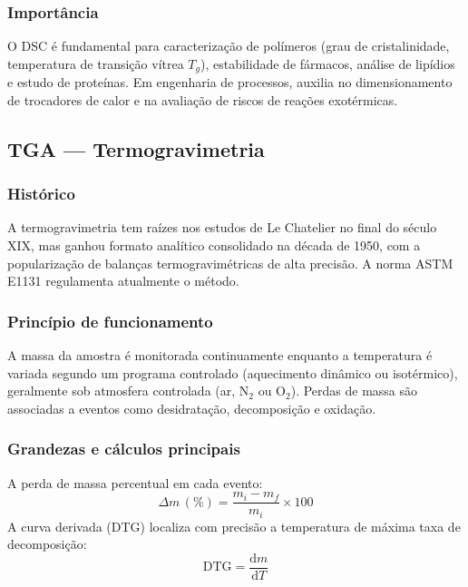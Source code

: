 \subsubsection*{Importância}

O DSC é fundamental para caracterização de polímeros (grau de
cristalinidade, temperatura de transição vítrea $T_g$), estabilidade de
fármacos, análise de lipídios e estudo de proteínas. Em engenharia de
processos, auxilia no dimensionamento de trocadores de calor e na avaliação
de riscos de reações exotérmicas.

\subsection{TGA --- Termogravimetria}

\subsubsection*{Histórico}

A termogravimetria tem raízes nos estudos de Le Chatelier no final do
século XIX, mas ganhou formato analítico consolidado na década de 1950,
com a popularização de balanças termogravimétricas de alta precisão. A
norma ASTM E1131 regulamenta atualmente o método.

\subsubsection*{Princípio de funcionamento}

A massa da amostra é monitorada continuamente enquanto a temperatura é
variada segundo um programa controlado (aquecimento dinâmico ou
isotérmico), geralmente sob atmosfera controlada (ar, $\text{N}_2$ ou
$\text{O}_2$). Perdas de massa são associadas a eventos como desidratação,
decomposição e oxidação.

\subsubsection*{Grandezas e cálculos principais}

A perda de massa percentual em cada evento:
\begin{equation}
    \Delta m\,(\%) = \frac{m_i - m_f}{m_i} \times 100
\end{equation}
A curva derivada (DTG) localiza com precisão a temperatura de máxima taxa
de decomposição:
\begin{equation}
    \text{DTG} = \frac{\mathrm{d}m}{\mathrm{d}T}
\end{equation}

